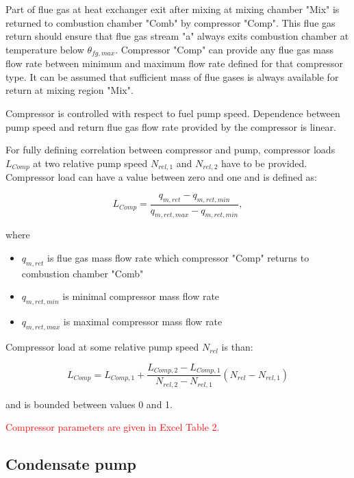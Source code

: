 \documentclass{article}
\begin{document}
	Part of flue gas at heat exchanger exit after mixing at mixing chamber 
	"Mix" is returned to combustion chamber "Comb" by compressor "Comp". This 
	flue gas return should ensure that flue gas stream "a" always exits 
	combustion chamber at temperature below $\theta_{fg,max}$. Compressor 
	"Comp" can provide any flue gas mass flow rate between minimum and maximum 
	flow rate defined for that compressor type. It can be assumed that 
	sufficient mass of flue gases is always available for return at mixing 
	region "Mix".
	
	Compressor is controlled with respect to fuel pump speed.  Dependence between pump speed and return flue gas flow rate provided by the compressor is linear. 
	
	For fully defining correlation between compressor and pump, compressor loads $L_{Comp}$ at two relative pump speed $N_{rel,1}$ and $N_{rel,2}$ have to be provided. Compressor load can have a value between zero and one and is defined as:
	
	\begin{equation}\label{eq:compressor_load}
		L_{Comp} = \frac{q_{m,ret} - q_{m,ret,min}}{q_{m,ret,max} - q_{m,ret,min}},
	\end{equation}
	
	\noindent
	where
	
	\begin{itemize}
		\item $q_{m,ret}$ is flue gas mass flow rate which compressor "Comp" 
		returns to combustion chamber "Comb"
		\item $q_{m,ret,min}$ is minimal compressor mass flow rate
		\item $q_{m,ret,max}$ is maximal compressor mass flow rate	
	\end{itemize}

	\noindent
	Compressor load at some relative pump speed $N_{rel}$ is than:
	
	\begin{equation}\label{eq:compressor_load_rel}
		L_{Comp} = L_{Comp,1} + \frac{L_{Comp,2} - L_{Comp,1}}{N_{rel,2} - N_{rel,1}} \left( N_{rel} - N_{rel,1}\right)
	\end{equation}
	
	\noindent
	and is bounded between values 0 and 1.
	
	\noindent
	\textcolor{red}{Compressor parameters are given in Excel Table 2.}
	
	\subsection{Condensate pump}
\end{document}
